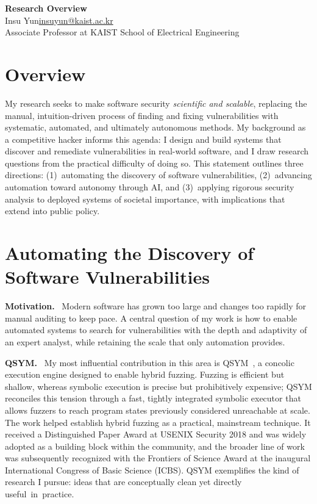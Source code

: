\documentclass[10pt,letterpaper]{article}
\makeatletter
\newcommand{\PP}[1]{\par\smallskip\noindent\textbf{#1.}\ }
\newcommand{\makeheader}{%
  \begin{center}
    {\LARGE\bfseries Research Overview}\\[2.5ex]
    {\large Insu Yun}\quad\textbar\quad\href{mailto:insuyun@kaist.ac.kr}{insuyun@kaist.ac.kr}\\[0.2ex]
    Associate Professor at KAIST School of Electrical Engineering
  \end{center}
  \vspace{1ex}
}
\makeatother
\begin{document}
\makeheader


\section{Overview}
My research seeks to make software security \emph{scientific and scalable},
replacing the manual, intuition-driven process of finding and fixing
vulnerabilities with systematic, automated, and ultimately autonomous methods.
My background as a competitive hacker informs this agenda: I design and build
systems that discover and remediate vulnerabilities in real-world software, and I
draw research questions from the practical difficulty of doing so. This statement
outlines three directions: (1)~automating the discovery of software
vulnerabilities, (2)~advancing automation toward autonomy through AI, and
(3)~applying rigorous security analysis to deployed systems of societal
importance, with implications that extend into public policy.

\section{Automating the Discovery of Software Vulnerabilities}
\PP{Motivation} Modern software has grown too large and changes too rapidly for
manual auditing to keep pace. A central question of my work is how to enable
automated systems to search for vulnerabilities with the depth and adaptivity of
an expert analyst, while retaining the scale that only automation provides.

\PP{QSYM} My most influential contribution in this area is QSYM~\cite{yun:qsym}, a
concolic execution engine designed to enable hybrid fuzzing. Fuzzing is efficient
but shallow, whereas symbolic execution is precise but prohibitively expensive;
QSYM reconciles this tension through a fast, tightly integrated symbolic executor
that allows fuzzers to reach program states previously considered unreachable at
scale. The work helped establish hybrid fuzzing as a practical, mainstream
technique. It received a Distinguished Paper Award at USENIX Security 2018 and
was widely adopted as a building block within the community, and the broader line
of work was subsequently recognized with the Frontiers of Science Award at the
inaugural International Congress of Basic Science (ICBS). QSYM exemplifies the
kind of research I pursue: ideas that are conceptually clean yet directly
useful~in~practice.
\end{document}
